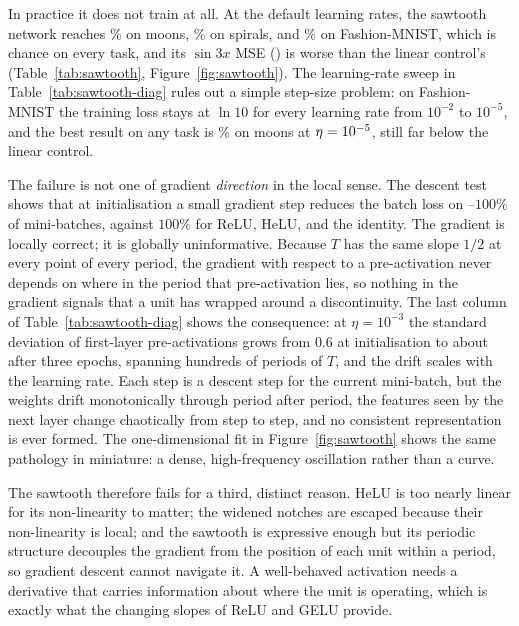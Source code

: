 \documentclass[11pt]{article}
\begin{document}
{In practice it does not train at all. At the default learning rates, the sawtooth network reaches
\accSawMoons\% on moons, \accSawSpirals\% on spirals, and \accSawFashion\% on Fashion-MNIST, which is
chance on every task, and its $\sin 3x$ MSE (\mseSawSin) is worse than the linear control's
(Table~\ref{tab:sawtooth}, Figure~\ref{fig:sawtooth}). The learning-rate sweep in
Table~\ref{tab:sawtooth-diag} rules out a simple step-size problem: on Fashion-MNIST the training loss
stays at $\ln 10$ for every learning rate from $10^{-2}$ to $10^{-5}$, and the best result on any task
is \sawBestMoons\% on moons at $\eta=10^{-5}$, still far below the linear control.

The failure is not one of gradient \emph{direction} in the local sense. The descent test shows that at
initialisation a small gradient step reduces the batch loss on \sawDescentLow--$100\%$ of
mini-batches, against $100\%$ for ReLU, HeLU, and the identity. The gradient is locally correct; it is
globally uninformative. Because $T$ has the same slope $1/2$ at every point of every period, the
gradient with respect to a pre-activation never depends on where in the period that pre-activation
lies, so nothing in the gradient signals that a unit has wrapped around a discontinuity. The last
column of Table~\ref{tab:sawtooth-diag} shows the consequence: at $\eta=10^{-3}$ the standard
deviation of first-layer pre-activations grows from $0.6$ at initialisation to about \sawDriftDefault{}
after three epochs, spanning hundreds of periods of $T$, and the drift scales with the learning rate.
Each step is a descent step for the current mini-batch, but the weights drift monotonically through
period after period, the features seen by the next layer change chaotically from step to step, and no
consistent representation is ever formed. The one-dimensional fit in Figure~\ref{fig:sawtooth} shows
the same pathology in miniature: a dense, high-frequency oscillation rather than a curve.

The sawtooth therefore fails for a third, distinct reason. HeLU is too nearly linear for its
non-linearity to matter; the widened notches are escaped because their non-linearity is local; and
the sawtooth is expressive enough but its periodic structure decouples the gradient from the position of
each unit within a period, so gradient descent cannot navigate it. A well-behaved activation needs a
derivative that carries information about where the unit is operating, which is exactly what the
changing slopes of ReLU and GELU provide.
}{}
\end{document}

